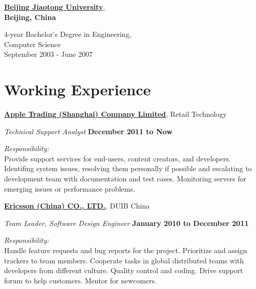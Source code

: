 \href{http://www.njtu.edu.cn/en/}{\textbf{Beijing Jiaotong University}},\\
\textbf{Beijing, China}
\begin{outerlist}
\item[] 4-year Bachelor's Degree in Engineering, \\
        {Computer Science}\\
        September 2003 - June 2007
\end{outerlist}       

%
\section{Working Experience}
\href{http://www.apple.com}{\textbf{Apple Trading (Shanghai) Company Limited}}, {Retail Technology}
\begin{outerlist}
\item[] \textit{Technical Support Analyst}%
        \hfill \textbf{December 2011 to Now}
\begin{outerlist}
\item \textit{Responsibility:}\\
Provide support services for end-users, content creators, and developers. Identifing system issues, resolving them personally if possible and escalating to development team with documentation and test cases. Monitoring servers for emerging issues or performance problems.
\end{outerlist}
\end{outerlist}
\blankline

\href{http://www.ericsson.com/cn}{\textbf{Ericsson (China) CO., LTD.}}, {DUIB China}
\begin{outerlist}
\item[] \textit{Team Leader, Software Design Engineer}%
        \hfill \textbf{January 2010 to December 2011}
\begin{outerlist}
\item \textit{Responsibility:}\\
Handle feature requests and bug reports for the project.
Prioritize and assign trackers to team members.
Cooperate tasks in global distributed teams with developers from different culture. Quality control and coding. Drive support forum to help customers. 
Mentor for newcomers.
\end{outerlist}
\end{outerlist}
\blankline

